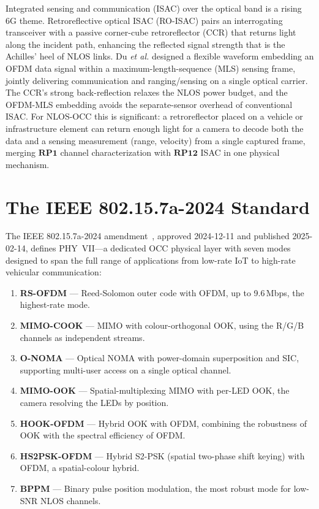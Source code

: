\documentclass[10pt,a4paper]{article}
\newcommand{\rp}[1]{\textbf{RP#1}}
\begin{document}
Integrated sensing and communication (ISAC) over the optical band is a
rising 6G theme. Retroreflective optical ISAC (RO-ISAC) pairs an
interrogating transceiver with a passive corner-cube retroreflector
(CCR) that returns light along the incident path, enhancing the
reflected signal strength that is the Achilles' heel of NLOS links. Du
\emph{et al.} \cite{du2025roisac} designed a flexible waveform embedding
an OFDM data signal within a maximum-length-sequence (MLS) sensing
frame, jointly delivering communication and ranging/sensing on a single
optical carrier. The CCR's strong back-reflection relaxes the NLOS power
budget, and the OFDM-MLS embedding avoids the separate-sensor overhead
of conventional ISAC. For NLOS-OCC this is significant: a retroreflector
placed on a vehicle or infrastructure element can return enough light
for a camera to decode both the data and a sensing measurement (range,
velocity) from a single captured frame, merging $\rp{1}$ channel
characterization with $\rp{12}$ ISAC in one physical mechanism.

\section{The IEEE 802.15.7a-2024 Standard}
\label{sec:standard}

The IEEE 802.15.7a-2024 amendment~\cite{ieee802157a2024}, approved
2024-12-11 and published 2025-02-14, defines PHY~VII---a dedicated OCC
physical layer with seven modes designed to span the full range of
applications from low-rate IoT to high-rate vehicular communication:

\begin{enumerate}
  \item \textbf{RS-OFDM} --- Reed-Solomon outer code with OFDM, up to
    9.6\,Mbps, the highest-rate mode.
  \item \textbf{MIMO-COOK} --- MIMO with colour-orthogonal OOK, using
    the R/G/B channels as independent streams.
  \item \textbf{O-NOMA} --- Optical NOMA with power-domain
    superposition and SIC, supporting multi-user access on a single
    optical channel.
  \item \textbf{MIMO-OOK} --- Spatial-multiplexing MIMO with per-LED
    OOK, the camera resolving the LEDs by position.
  \item \textbf{HOOK-OFDM} --- Hybrid OOK with OFDM, combining the
    robustness of OOK with the spectral efficiency of OFDM.
  \item \textbf{HS2PSK-OFDM} --- Hybrid S2-PSK (spatial two-phase shift
    keying) with OFDM, a spatial-colour hybrid.
  \item \textbf{BPPM} --- Binary pulse position modulation, the most
    robust mode for low-SNR NLOS channels.
\end{enumerate}
\end{document}
